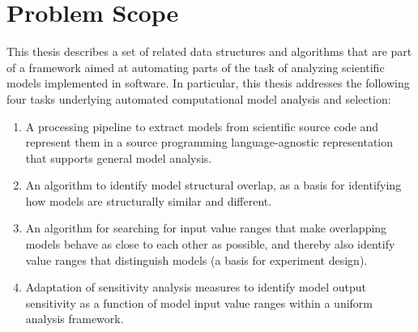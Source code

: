 
\section{Problem Scope\label{sec:prob_scope}}
This thesis describes a set of related data structures and algorithms that are part of a framework aimed at automating parts of the task of analyzing scientific models implemented in software. In particular, this thesis addresses the following four tasks underlying automated computational model analysis and selection:

\begin{enumerate}
  \item A processing pipeline to extract models from scientific source code and represent them in a source programming language-agnostic representation that supports general model analysis.
  \item An algorithm to identify model structural overlap, as a basis for identifying how models are structurally similar and different.
  \item An algorithm for searching for input value ranges that make overlapping models behave as close to each other as possible, and thereby also identify value ranges that distinguish models (a basis for experiment design).
  \item Adaptation of sensitivity analysis measures to identify model output sensitivity as a function of model input value ranges within a uniform analysis framework.
\end{enumerate}

